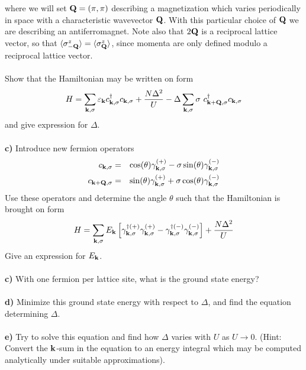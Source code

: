 \documentclass{article}
\begin{document}
where we will set ${\bf Q}=(\pi,\pi)$
describing a magnetization which varies periodically in space with a characteristic wavevector ${\bf Q}$.  With this particular choice of ${\bf Q}$
we are describing an antiferromagnet. Note also that $2 {\bf Q}$ is a reciprocal lattice vector, so that 
$\langle  \sigma^z_{-\bf Q} \rangle  = \langle \sigma^z_{\bf Q} \rangle $, since momenta are only defined modulo a reciprocal lattice vector.
\ \\
\ \\
Show that the Hamiltonian may be written on form
\begin{eqnarray}
H = \sum_{{\bf k},\sigma}  {\varepsilon_{{\bf k}}}  c^{\dagger}_{{\bf k},\sigma} c_{{\bf k},\sigma} + \frac{N \Delta^2}{U} 
- \Delta \sum_{{\bf k},\sigma} \sigma  ~ c^{\dagger}_{{\bf k}+{\bf Q},\sigma} c_{{\bf k},\sigma}  \nonumber
\end{eqnarray} 
and give expression for $\Delta$.
\ \\
\ \\
{\bf c)} Introduce new fermion operators
\begin{eqnarray}
c_{{\bf k},\sigma} & = & \cos(\theta) \gamma^{(+)}_{{\bf k},\sigma} - \sigma \sin(\theta) \gamma^{(-)}_{{\bf k},\sigma} \nonumber \\
c_{{\bf k}+{\bf Q},\sigma} & = & \sin(\theta) \gamma^{(+)}_{{\bf k},\sigma} + \sigma \cos(\theta) \gamma^{(-)}_{{\bf k},\sigma} \nonumber 
\end{eqnarray}
Use these operators and determine the angle $\theta$ such that the Hamiltonian is brought on form
\begin{eqnarray}
H = \sum_{{\bf k}, \sigma} E_{\bf k} \left[ \gamma^{\dagger (+)}_{{\bf k},\sigma}    \gamma^{(+)}_{{\bf k},\sigma}  
-  \gamma^{\dagger (-)}_{{\bf k},\sigma}    \gamma^{(-)}_{{\bf k},\sigma}  \right] + \frac{N \Delta^2}{U} \nonumber
\end{eqnarray} 
Give an expression for $E_{\bf k}$.
\ \\
\ \\
{\bf c)} With one fermion per lattice site, what is the ground state energy? 
\ \\
\ \\
{\bf d)} Minimize this ground state energy with respect to $\Delta$, and find the equation determining $\Delta$.
\ \\
\ \\
{\bf e)} Try to solve this equation and find how $\Delta$ varies with $U$ as $U \to 0$. (Hint: Convert the ${\bf k}$-sum in the equation to an energy integral which may be computed analytically under suitable approximations).  
\ \\
\ \\
\end{document}
